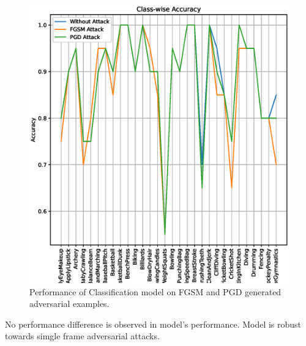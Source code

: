 \documentclass[10pt,twocolumn,letterpaper]{article}
\begin{document}
\begin{figure}[!ht]
    \centering
    \includegraphics[width=\columnwidth]{./Images/Standard-Adversarial-Attack.eps}
    \caption{Performance of Classification model on FGSM and PGD generated adversarial examples.}
\end{figure}
No performance difference is observed in model's performance. Model is robust towards simgle frame adversarial attacks.
\end{document}
